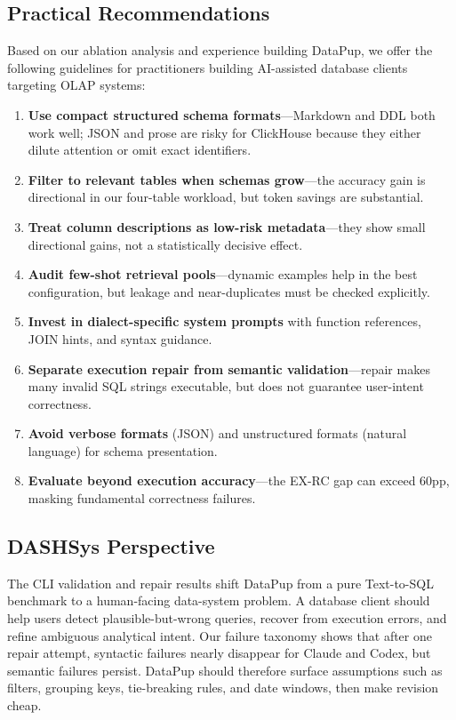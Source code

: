 \documentclass[sigconf, nonacm]{acmart}
\begin{document}
\subsection{Practical Recommendations}
Based on our ablation analysis and experience building DataPup, we offer the following guidelines for practitioners building AI-assisted database clients targeting OLAP systems:
\begin{enumerate}
    \item \textbf{Use compact structured schema formats}---Markdown and DDL both work well; JSON and prose are risky for ClickHouse because they either dilute attention or omit exact identifiers.
    \item \textbf{Filter to relevant tables when schemas grow}---the accuracy gain is directional in our four-table workload, but token savings are substantial.
    \item \textbf{Treat column descriptions as low-risk metadata}---they show small directional gains, not a statistically decisive effect.
    \item \textbf{Audit few-shot retrieval pools}---dynamic examples help in the best configuration, but leakage and near-duplicates must be checked explicitly.
    \item \textbf{Invest in dialect-specific system prompts} with function references, JOIN hints, and syntax guidance.
    \item \textbf{Separate execution repair from semantic validation}---repair makes many invalid SQL strings executable, but does not guarantee user-intent correctness.
    \item \textbf{Avoid verbose formats} (JSON) and unstructured formats (natural language) for schema presentation.
    \item \textbf{Evaluate beyond execution accuracy}---the EX-RC gap can exceed 60pp, masking fundamental correctness failures.
\end{enumerate}

\subsection{DASHSys Perspective}
The CLI validation and repair results shift DataPup from a pure Text-to-SQL benchmark to a human-facing data-system problem. A database client should help users detect plausible-but-wrong queries, recover from execution errors, and refine ambiguous analytical intent. Our failure taxonomy shows that after one repair attempt, syntactic failures nearly disappear for Claude and Codex, but semantic failures persist. DataPup should therefore surface assumptions such as filters, grouping keys, tie-breaking rules, and date windows, then make revision cheap.
\end{document}
